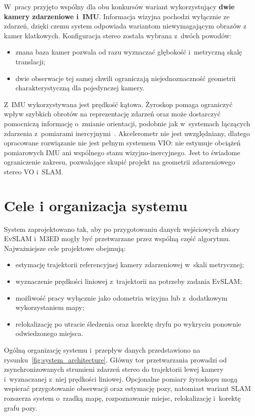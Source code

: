 W~pracy przyjęto wspólny dla obu konkursów wariant wykorzystujący
\textbf{dwie kamery zdarzeniowe i~IMU}. Informacja wizyjna pochodzi wyłącznie
ze zdarzeń, dzięki czemu system odpowiada wariantom niewymagającym obrazów z kamer klatkowych. Konfiguracja stereo została wybrana z~dwóch powodów:

\begin{itemize}
    \item znana baza kamer pozwala od razu wyznaczać głębokość i~metryczną skalę translacji;
    \item dwie obserwacje tej samej chwili ograniczają niejednoznaczność geometrii charakterystyczną dla pojedynczej kamery.
\end{itemize}

Z~IMU wykorzystywana jest prędkość kątowa. Żyroskop pomaga ograniczyć wpływ
szybkich obrotów na reprezentację zdarzeń oraz może dostarczyć pomocniczą
informację o~zmianie orientacji, podobnie jak w~systemach łączących zdarzenia
z~pomiarami inercyjnymi~\cite{rebecq2017eventvio,vidal2018ultimate}.
Akcelerometr nie jest uwzględniany, dlatego opracowane rozwiązanie nie jest
pełnym systemem VIO: nie estymuje obciążeń pomiarowych IMU
ani wspólnego stanu wizyjno-inercyjnego. Jest to świadome ograniczenie zakresu,
pozwalające skupić projekt na geometrii zdarzeniowego stereo VO i~SLAM.

\section{Cele i organizacja systemu}
\label{sec:architektura_systemu}

System zaprojektowano tak, aby po przygotowaniu danych wejściowych zbiory EvSLAM i~M3ED mogły być przetwarzane przez wspólną część algorytmu. Najważniejsze cele projektowe obejmują:

\begin{itemize}
\item estymację trajektorii referencyjnej kamery zdarzeniowej w~skali metrycznej;
\item wyznaczenie prędkości liniowej z~trajektorii na potrzeby zadania EvSLAM;
\item możliwość pracy wyłącznie jako odometria wizyjna lub z~dodatkowym wykorzystaniem mapy;
\item relokalizację po utracie śledzenia oraz korektę dryfu po wykryciu ponownie odwiedzonego miejsca.
\end{itemize}

Ogólną organizację systemu i~przepływ danych przedstawiono na rysunku~\ref{fig:system_architecture}. Główny tor przetwarzania prowadzi od zsynchronizowanych strumieni zdarzeń stereo do trajektorii lewej kamery i~wyznaczanej z~niej prędkości liniowej. Opcjonalne pomiary żyroskopu mogą wspierać przygotowanie obserwacji oraz estymację pozy, natomiast wariant SLAM rozszerza system o~rzadką mapę, rozpoznawanie miejsc, relokalizację i~korektę grafu pozy.

